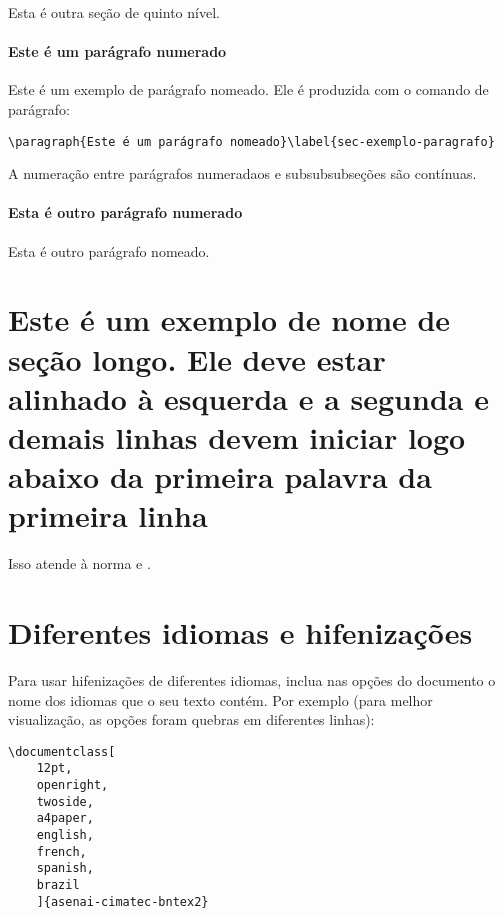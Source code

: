 Esta é outra seção de quinto nível.


\paragraph{Este é um parágrafo numerado}\label{sec-exemplo-paragrafo}

Este é um exemplo de parágrafo nomeado. Ele é produzida com o comando de
parágrafo:

\begin{verbatim}
\paragraph{Este é um parágrafo nomeado}\label{sec-exemplo-paragrafo}
\end{verbatim}

A numeração entre parágrafos numeradaos e subsubsubseções são contínuas.

\paragraph{Esta é outro parágrafo numerado}\label{sec-exemplo-paragrafo-outro}

Esta é outro parágrafo nomeado.

\section{Este é um exemplo de nome de seção longo. Ele deve estar
  alinhado à esquerda e a segunda e demais linhas devem iniciar logo abaixo da
  primeira palavra da primeira linha}

Isso atende à norma 
e .

\section{Diferentes idiomas e hifenizações}
\label{sec-hifenizacao}

Para usar hifenizações de diferentes idiomas, inclua nas opções do documento o
nome dos idiomas que o seu texto contém. Por exemplo (para melhor
visualização, as opções foram quebras em diferentes linhas):

\begin{verbatim}
\documentclass[
	12pt,
	openright,
	twoside,
	a4paper,
	english,
	french,
	spanish,
	brazil
	]{asenai-cimatec-bntex2}
\end{verbatim}

